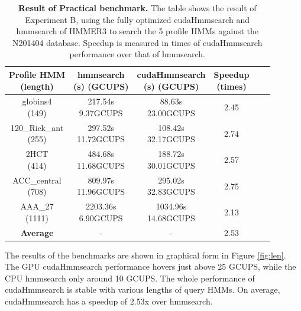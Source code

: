 \begin{table}[H]
\centering
\begin{tabular}{|c|c|c|c|c|c|}\hline
\shortstack{\textbf{Profile HMM} \\ \textbf{(length)}} & \shortstack{\textbf{hmmsearch} \\ (s) (GCUPS)} & \shortstack{\textbf{cudaHmmsearch} \\ (s) (GCUPS)} & \shortstack{\textbf{Speedup} \\ (times)} \\\hline
\shortstack{globins4 \\ (149)} & \shortstack{217.54s \\ 9.37GCUPS} & \shortstack{88.63s \\ 23.00GCUPS} & 2.45 \\\hline
\shortstack{120\_Rick\_ant \\ (255)} & \shortstack{297.52s \\ 11.72GCUPS} & \shortstack{108.42s \\ 32.17GCUPS} & 2.74 \\\hline
\shortstack{2HCT \\ (414)} & \shortstack{484.68s \\ 11.68GCUPS} & \shortstack{188.72s \\ 30.01GCUPS} & 2.57 \\\hline
\shortstack{ACC\_central \\ (708)} & \shortstack{809.97s \\ 11.96GCUPS} & \shortstack{295.02s \\ 32.83GCUPS} & 2.75 \\\hline
\shortstack{AAA\_27 \\ (1111)} & \shortstack{2203.36s \\ 6.90GCUPS} & \shortstack{1034.96s \\ 14.68GCUPS} & 2.13 \\\hline
\textbf{Average} & - & - & 2.53 \\\hline
\end{tabular}
\caption{\selectfont \textbf{Result of Practical benchmark.} \label{tab.pb} The table shows the result of Experiment B, using the fully optimized cudaHmmsearch and hmmsearch of HMMER3 to search the 5 profile HMMs against the N201404 database. Speedup is measured in times of cudaHmmsearch performance over that of hmmsearch.}
\end{table}

The results of the benchmarks are shown in graphical form in Figure \ref{fig:len}. The GPU cudaHmmsearch performance hovers just above 25 GCUPS, while the CPU hmmsearch only around 10 GCUPS. The whole performance of cudaHmmsearch is stable with various lengths of query HMMs. On average, cudaHmmsearch has a speedup of 2.53x over hmmsearch. 

